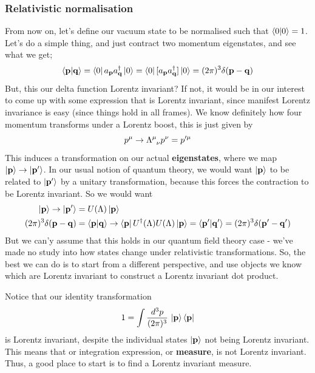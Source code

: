 \documentclass[11pt, oneside]{article}   	%
\theoremstyle{newline}
\theoremstyle{newline}
\theoremstyle{newline}
\theoremstyle{newline}
\theoremstyle{newline}
\newcommand{\intp}{ \int \frac{ d^3 p }{ (2 \pi)^3 } \, }
\newcommand{\ann}[1]{a_{ \mathbf{ #1 }}}
\newcommand{\crea}[1]{a^\dagger_{ \mathbf{ #1 }}}
\newcommand{\ve}[1]{ \mathbf{ #1 } }
\begin{document}
\subsubsection{Relativistic normalisation} 
From now on, let's define our vacuum state to be normalised such that $ \bra{0}\ket{0}  = 1$. Let's do a simple thing, and just contract two momentum eigenstates, and see what we get; 
\[
\bra{\ve{ p } }\ket{ \ve{ q}} = \bra{ 0 }\ann{ p} \crea{ q } \ket{ 0 }  = \bra{ 0 }[ \ann{p } \crea{ q} ] \ket{0 }  = ( 2\pi )^3 \delta( \ve { p - q} ) 
\]  But, this our delta function Lorentz invariant? If not, it would be in our interest to come up with some expression that is Lorentz invariant, since manifest Lorentz invariance is easy (since things hold in all frames). We know definitely how four momentum transforms under a Lorentz boost, this is just given by
\[ 
p^\mu \rightarrow \Lambda\indices{^\mu_\nu} p^\nu  = p'^\mu 
\] This induces a transformation on our actual \textbf{eigenstates}, where we map $ \ket{ \ve{ p } } \rightarrow \ket{ \ve{ p '} }$.  
In our usual notion of quantum theory, we would want $ \ket{ \ve{ p } } $ to be related to $ \ket{ \ve{ p' } } $ by a unitary transformation, because this forces the contraction to be Lorentz invariant. So we would want 
\begin{align*} 
\ket{ \ve{ p } } \rightarrow \ket{ \ve{ p ' }}  & = U ( \Lambda) \ket { \ve { p }} \\
( 2\pi )^3 \delta( \ve{ p - q} ) &=  \bra{ \ve { p } }\ket{ \ve { q } }  \rightarrow \bra{ \ve{ p } }U^\dagger( \Lambda ) U ( \Lambda ) \ket{\ve{ p } }  = \bra{ \ve{ p ' }}\ket{ \ve{ q' } }  = (2 \pi )^3 \delta ( \ve{ p' - q' } ) 
\end{align*} 
But we can'y assume that this holds in our quantum field theory case - we've made no study into how states change under relativistic transformations. So, the best we can do is to start from a different perspective, and use objects we know which are Lorentz invariant to construct a Lorentz invariant dot product. 

Notice that our identity transformation
\[ 
1 = \intp \ket{\ve{ p } }\bra{ \ve { p } } 
\] is Lorentz invariant, despite the individual states $\ket { \ve{ p } } $ not being Lorentz invariant. This means that or integration expression, or \textbf{measure}, is not Lorentz invariant. Thus, a good place to start is to find a Lorentz invariant measure.
\end{document}
